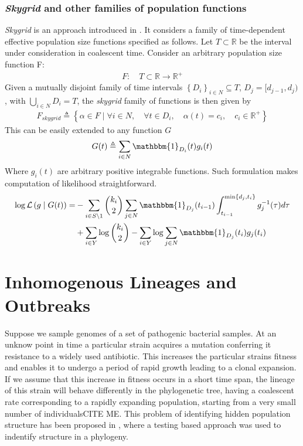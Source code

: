 \documentclass{report}
\newcommand{\R}{\mathbb{R}}
\newcommand{\CITEMISSING}{\colorbox{BurntOrange}{CITE ME}}
\theoremstyle{definition}
\begin{document}
\subsubsection{\textit{Skygrid} and other families of population functions}
\textit{Skygrid} is an approach introduced in \cite{gill_improving_2013}. It considers a family of time-dependent effective population size functions specified as follows. Let $T\subset\R$ be the interval under consideration in coalescent time. Consider an arbitrary population size function F:
\begin{gather}
  F:\quad T\subset\R \rightarrow \R^+
\end{gather}
Given a mutually disjoint family of time intervals $\left\{D_i\right\}_{i\in N}\subseteq T$, $D_j = [d_{j-1}, d_{j})$,  with $\bigcup\limits_{i\in N} D_i = T$, the \textit{skygrid} family of functions is then given by 
\begin{gather}
F_{skygrid}\triangleq\left\{\alpha\in F\mid\forall i\in N,\quad \forall t \in D_i,\quad \alpha(t) = c_i,\quad c_i\in\R^+\right\}
\end{gather}
This can be easily extended to any function $G$
\begin{gather}
 G(t)\triangleq\sum_{i\in N}{\mathbbm{1}_{D_i}(t)g_i(t)}
\end{gather}
Where $g_i(t)$ are arbitrary positive integrable functions.
Such formulation makes computation of likelihood straightforward.
\begin{gather}
\begin{aligned}
\log\mathcal{L}\left(g\mid G(t)\right) 
=& -\sum_{i\in S\setminus 1}{
\binom{k_i}{2}\sum_{j\in N}{\mathbbm{1}_{D_j}(t_{i-1})
\int_{t_{i-1}}^{\min\{d_j, t_i\}}{g^{-1}_j(\tau)d\tau}}}\\
&+\sum_{i\in Y}{\log\binom{k_i}{2}} - \sum_{i\in Y}{\log{\sum_{j\in N}{\mathbbm{1}_{D_j}(t_i)g_j(t_i)}}}
\end{aligned}
\end{gather}
\section{Inhomogenous Lineages and Outbreaks}\label{section:multi}
Suppose we sample genomes of a set of pathogenic bacterial samples. 
At an unknow point in time a particular strain acquires a mutation conferring it resistance to a widely used antibiotic. This increases the particular strains fitness and enables it to undergo a period of rapid growth leading to a clonal expansion. If we assume that this increase in fitness occurs in a short time span, the lineage of this strain will behave differently in the phylogenetic tree, having a coalescent rate corresponding to a rapidly expanding population, starting from a very small number of individuals\CITEMISSING. This problem of identifying hidden population structure has been proposed in \cite{volz_identification_nodate}, where a testing based approach was used to indentify structure in a phylogeny.\\
\end{document}
